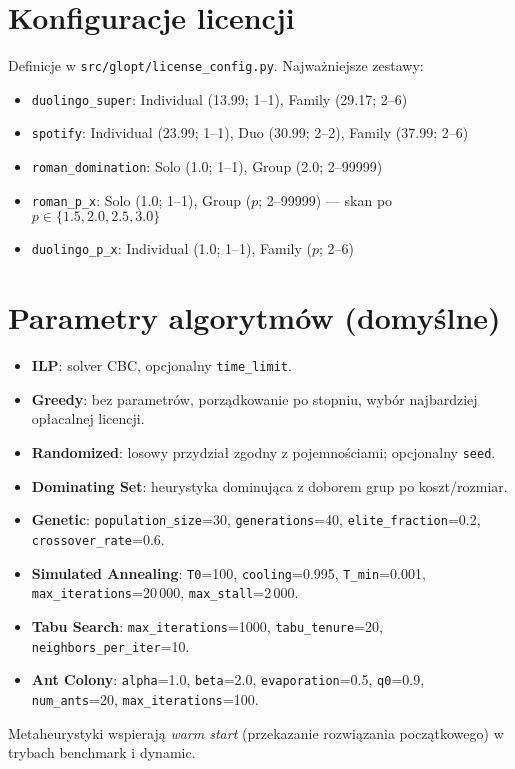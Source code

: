 \section{Konfiguracje licencji}
Definicje w \texttt{src/glopt/license\_config.py}. Najważniejsze zestawy:
\begin{itemize}
  \item \texttt{duolingo\_super}: Individual (13.99; 1–1), Family (29.17; 2–6)
  \item \texttt{spotify}: Individual (23.99; 1–1), Duo (30.99; 2–2), Family (37.99; 2–6)
  \item \texttt{roman\_domination}: Solo (1.0; 1–1), Group (2.0; 2–99999)
  \item \texttt{roman\_p\_x}: Solo (1.0; 1–1), Group ($p$; 2–99999) — skan po $p\in\{1.5,2.0,2.5,3.0\}$
  \item \texttt{duolingo\_p\_x}: Individual (1.0; 1–1), Family ($p$; 2–6)
\end{itemize}

\section{Parametry algorytmów (domyślne)}
\begin{itemize}
  \item \textbf{ILP}: solver CBC, opcjonalny \texttt{time\_limit}.
  \item \textbf{Greedy}: bez parametrów, porządkowanie po stopniu, wybór najbardziej opłacalnej licencji.
  \item \textbf{Randomized}: losowy przydział zgodny z pojemnościami; opcjonalny \texttt{seed}.
  \item \textbf{Dominating Set}: heurystyka dominująca z doborem grup po koszt/rozmiar.
  \item \textbf{Genetic}: \texttt{population\_size}=30, \texttt{generations}=40, \texttt{elite\_fraction}=0.2, \texttt{crossover\_rate}=0.6.
  \item \textbf{Simulated Annealing}: \texttt{T0}=100, \texttt{cooling}=0.995, \texttt{T\_min}=0.001, \texttt{max\_iterations}=20\,000, \texttt{max\_stall}=2\,000.
  \item \textbf{Tabu Search}: \texttt{max\_iterations}=1000, \texttt{tabu\_tenure}=20, \texttt{neighbors\_per\_iter}=10.
  \item \textbf{Ant Colony}: \texttt{alpha}=1.0, \texttt{beta}=2.0, \texttt{evaporation}=0.5, \texttt{q0}=0.9, \texttt{num\_ants}=20, \texttt{max\_iterations}=100.
\end{itemize}
Metaheurystyki wspierają \emph{warm start} (przekazanie rozwiązania początkowego) w trybach benchmark i dynamic.


